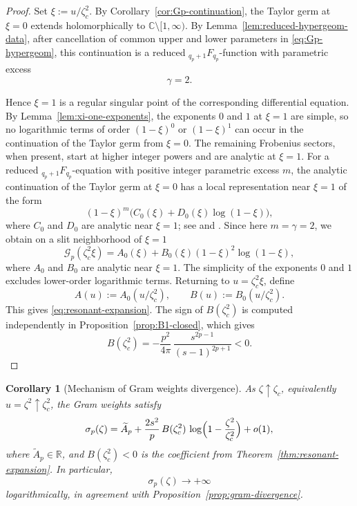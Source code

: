 \documentclass[11pt]{amsart}
\numberwithin{equation}{section}
\theoremstyle{plain}
\newtheorem{corollary}[theorem]{Corollary}
\theoremstyle{definition}
\theoremstyle{remark}
\newcommand{\CC}{\mathbb{C}}
\begin{document}
\begin{proof}
	Set \(\xi:=u/\zeta_c^2\). By Corollary~\ref{cor:Gp-continuation}, the Taylor
	germ at \(\xi=0\) extends holomorphically to
	\(\CC\setminus[1,\infty)\). By Lemma~\ref{lem:reduced-hypergeom-data}, after
	cancellation of common upper and lower parameters in
	\eqref{eq:Gp-hypergeom}, this continuation is a reduced
	\({}_{q_p+1}F_{q_p}\)-function with parametric excess
	\[
		\gamma=2.
	\]

	Hence \(\xi=1\) is a regular singular point of the corresponding differential
	equation. By Lemma~\ref{lem:xi-one-exponents}, the exponents \(0\) and \(1\)
	at \(\xi=1\) are simple, so no logarithmic terms of order
	\((1-\xi)^0\) or \((1-\xi)^1\) can occur in the continuation of the
	Taylor germ from \(\xi=0\). The remaining Frobenius sectors, when present,
	start at higher integer powers and are analytic at \(\xi=1\). For a
	reduced \({}_{q_p+1}F_{q_p}\)-equation with positive integer parametric
	excess \(m\), the analytic continuation of the Taylor germ at \(\xi=0\) has
	a local representation near \(\xi=1\) of the form
	\[
		(1-\xi)^m\bigl(C_0(\xi)+D_0(\xi)\log(1-\xi)\bigr),
	\]
	where \(C_0\) and \(D_0\) are analytic near \(\xi=1\); see
	\cite[\S16.8(i), \S16.11(ii)]{NIST:DLMF} and \cite[Ch.~4]{Slater1966}.
	Since here \(m=\gamma=2\), we obtain on a slit neighborhood of \(\xi=1\)
	\[
		\mathcal G_p(\zeta_c^2\xi)
		=
		A_0(\xi)+B_0(\xi)(1-\xi)^2\log(1-\xi),
	\]
	where \(A_0\) and \(B_0\) are analytic near \(\xi=1\). The simplicity of the
	exponents \(0\) and \(1\) excludes lower-order logarithmic terms. Returning to \(u=\zeta_c^2\xi\), define
	\[
		A(u):=A_0(u/\zeta_c^2),
		\qquad
		B(u):=B_0(u/\zeta_c^2).
	\]
	This gives \eqref{eq:resonant-expansion}. The sign of \(B(\zeta_c^2)\) is
	computed independently in Proposition~\ref{prop:B1-closed}, which gives
	\[
		B(\zeta_c^2)
		=
		-
		\frac{p^2}{4\pi}\,\frac{s^{2p-1}}{(s-1)^{2p+1}}
		<0.
	\]
\end{proof}

\begin{corollary}[Mechanism of Gram weights divergence]
	\label{cor:divergence-mechanism}
	As \(\zeta\uparrow\zeta_c\), equivalently \(u=\zeta^2\uparrow\zeta_c^2\),
	the Gram weights satisfy
	\[
		\sigma_p(\zeta)
		=
		\widetilde A_p
		+
		\frac{2s^2}{p}\,B(\zeta_c^2)\,
		\log\Bigl(1-\frac{\zeta^2}{\zeta_c^2}\Bigr)
		+
		o(1),
	\]
	where \(\widetilde A_p\in\mathbb R\), and \(B(\zeta_c^2)<0\) is the coefficient
	from Theorem~\textup{\ref{thm:resonant-expansion}}. In particular,
	\[
		\sigma_p(\zeta)\to+\infty
	\]
	logarithmically, in agreement with
	Proposition~\textup{\ref{prop:gram-divergence}}.
\end{corollary}
\end{document}
